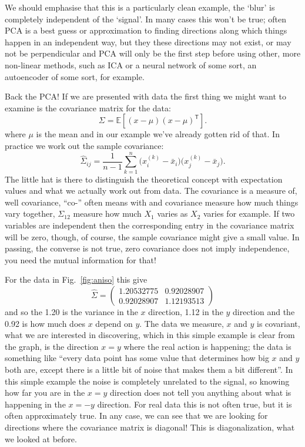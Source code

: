 \documentclass[12pt]{article}
\begin{document}
We should emphasise that this is a particularly clean example, the
`blur' is completely independent of the `signal'. In many cases this
won't be true; often PCA is a best guess or approximation to finding
directions along which things happen in an independent way, but they
these directions may not exist, or may not be perpendicular and PCA
will only be the first step before using other, more non-linear
methods, such as ICA or a neural network of some sort, an autoencoder
of some sort, for example.

Back the PCA! If we are presented with data the first thing we might
want to examine is the covariance matrix for the data:
\begin{equation}
\Sigma
=
\mathbb{E}\!\left[(x-\mu)(x-\mu)^{\mathsf T}\right].
\end{equation}
where $\mu$ is the mean and in our example we've already gotten rid of
that. In practice we work out the sample covariance:
\begin{equation}
\hat{\Sigma}_{ij}
=
\frac{1}{n-1}
\sum_{k=1}^{n}
\bigl(x_i^{(k)}-\bar{x}_i\bigr)
\bigl(x_j^{(k)}-\bar{x}_j\bigr).
\end{equation}
The little hat is there to distinguish the theoretical concept with
expectation values and what we actually work out from data. The
covariance is a measure of, well covariance, ``co-'' often means with
and covariance measure how much things vary together, $\Sigma_{12}$
measure how much $X_1$ varies as $X_2$ varies for example. If two
variables are independent then the corresponding entry in the
covariance matrix will be zero, though, of course, the sample
covariance might give a small value. In passing, the converse is not
true, zero covariance does not imply independence, you need the mutual
information for that!

For the data in Fig.~\ref{fig:aniso} this give
\begin{equation}
  \hat{\Sigma}=\begin{pmatrix}
  1.20532775& 0.92028907\\
0.92028907& 1.12193513
  \end{pmatrix}
\end{equation}
and so the 1.20 is the variance in the $x$ direction, 1.12 in the $y$
direction and the 0.92 is how much does $x$ depend on $y$. The data we
measure, $x$ and $y$ is covariant, what we are interested in
discovering, which in this simple example is clear from the graph, is
the direction $x=y$ where the real action is happening; the data is
something like ``every data point has some value that determines how
big $x$ and $y$ both are, except there is a little bit of noise that
makes them a bit different''. In this simple example the noise is
completely unrelated to the signal, so knowing how far you are in the
$x=y$ direction does not tell you anything about what is happening in
the $x=-y$ direction. For real data this is not often true, but it is
often approximately true. In any case, we can see that we are looking
for directions where the covariance matrix is diagonal! This is
diagonalization, what we looked at before.
\end{document}
